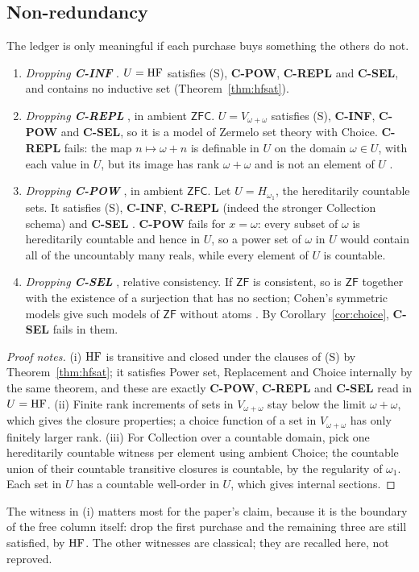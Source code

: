 \subsection{Non-redundancy}\label{ssec:nonredundancy}

The ledger is only meaningful if each purchase buys something the others do not.

\begin{proposition}\label{prop:nonredundancy}
\begin{enumerate}[label=\textup{(\roman*)}]
\item \emph{Dropping \textbf{C-INF}} \inhouse. $U=\mathrm{HF}$ satisfies (S), \textbf{C-POW},
\textbf{C-REPL} and \textbf{C-SEL}, and contains no inductive set (Theorem~\ref{thm:hfsat}).
\item \emph{Dropping \textbf{C-REPL}} \condg, in ambient $\mathsf{ZFC}$. $U=V_{\omega+\omega}$
satisfies (S), \textbf{C-INF}, \textbf{C-POW} and \textbf{C-SEL}, so it is a model of Zermelo set
theory with Choice. \textbf{C-REPL} fails: the map $n\mapsto\omega+n$ is definable in $U$ on the
domain $\omega\in U$, with each value in $U$, but its image has rank $\omega+\omega$ and is not an
element of $U$ \citep[Ch.~12]{Jech2003}.
\item \emph{Dropping \textbf{C-POW}} \condg, in ambient $\mathsf{ZFC}$. Let $U=H_{\omega_1}$, the
hereditarily countable sets. It satisfies (S), \textbf{C-INF}, \textbf{C-REPL} (indeed the stronger
Collection schema) and \textbf{C-SEL} \citep{GitmanHamkinsJohnstone2016}. \textbf{C-POW} fails for
$x=\omega$: every subset of $\omega$ is hereditarily countable and hence in $U$, so a power set of
$\omega$ in $U$ would contain all of the uncountably many reals, while every element of $U$ is
countable.
\item \emph{Dropping \textbf{C-SEL}} \condg, relative consistency. If $\mathsf{ZF}$ is consistent,
so is $\mathsf{ZF}$ together with the existence of a surjection that has no section; Cohen's
symmetric models give such models of $\mathsf{ZF}$ without atoms \citep{Cohen1966,Jech1973}. By
Corollary~\ref{cor:choice}, \textbf{C-SEL} fails in them.
\end{enumerate}
\end{proposition}

\begin{proof}[Proof notes]
(i) $\mathrm{HF}$ is transitive and closed under the clauses of (S) by Theorem~\ref{thm:hfsat}; it
satisfies Power set, Replacement and Choice internally by the same theorem, and these are exactly
\textbf{C-POW}, \textbf{C-REPL} and \textbf{C-SEL} read in $U=\mathrm{HF}$. (ii) Finite rank increments of
sets in $V_{\omega+\omega}$ stay below the limit $\omega+\omega$, which gives the closure
properties; a choice function of a set in $V_{\omega+\omega}$ has only finitely larger rank. (iii)
For Collection over a countable domain, pick one hereditarily countable witness per element using
ambient Choice; the countable union of their countable transitive closures is countable, by the
regularity of $\omega_1$. Each set in $U$ has a countable well-order in $U$, which gives internal
sections.
\end{proof}

The witness in (i) matters most for the paper's claim, because it is the boundary of the free
column itself: drop the first purchase and the remaining three are still satisfied, by $\mathrm{HF}$. The
other witnesses are classical; they are recalled here, not reproved.
